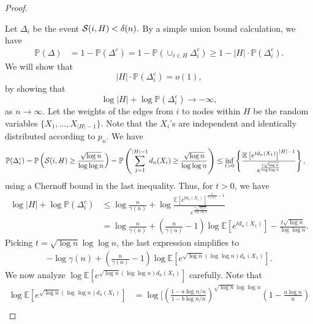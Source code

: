 \begin{proof}
\label{AppLemDelta}

Let $\Delta_i$ be the event  ${\cal S}(i , H) < \delta(n).$ By a simple union bound calculation, we have
\begin{align*}
\mathbb P(\Delta) &=1- \mathbb P(\Delta^c) = 1 - \mathbb P \left( \cup_{i \in H} \Delta_i^c \right) \ge 1 - |H| \cdot \mathbb P(\Delta_i^c).
\end{align*}
We will show that $$|H| \cdot \mathbb P(\Delta_i^c) = o(1),$$ by showing that
$$\log |H| + \log \mathbb P(\Delta_i^c) \to -\infty,$$ as $n \to \infty$. 
Let the weights of the edges from $i$ to nodes within $H$ be the random variables $\{X_1, \dots, X_{|H| - 1}\}$. Note that the $X_i$'s are independent and identically distributed according to $p_n$. We have
\begin{align*}
\mathbb P(\Delta_i^c) &= \mathbb P\left( {\cal S}(i, H) \geq \frac{\sqrt{\log n}}{\log \log n}\right) = \mathbb P\left( \sum_{j = 1}^ {|H|-1} d_n(X_i) \ge \frac{\sqrt{\log n}}{\log \log n}\right) \leq \inf_{t > 0} \left\{ \frac{\mathbb E\left[ e^{td_n(X_1)}\right]^{|H|-1}}{e^{\frac{t\sqrt{\log n}}{\log \log n}}}\right\},
\end{align*}
using a Chernoff bound in the last inequality. Thus, for $t > 0$, we have
\begin{align*}
\log |H| + \log \mathbb P(\Delta_i^c) &\leq \log \frac{n}{\gamma(n)} + \log \frac{\mathbb E\left[ e^{td_n(X_1)}\right]^{ \frac{n}{\gamma(n)}-1}}{e^{\frac{t\sqrt{\log n}}{\log \log n}}}\\
%
&= \log \frac{n}{\gamma(n)} + \left(\frac{n}{\gamma(n)}-1\right)\log \mathbb E\left[e^{td_n(X_1)} \right] - \frac{t\sqrt{\log n}}{\log \log n}.
\end{align*}
Picking $t = \sqrt{\log n}\log\log n$, the last expression simplifies to
\begin{align}\label{eq: master}
-\log \gamma(n) +  \left(\frac{n}{\gamma(n)}-1\right)\log \mathbb E\left[e^{\sqrt{\log n}(\log\log n) d_n(X_1)} \right].
\end{align}
We now analyze $\log \mathbb E\left[e^{\sqrt{\log n}(\log\log n) d_n(X_1)} \right]$ carefully. Note that
\begin{align*}
\log \mathbb E\left[e^{\sqrt{\log n}(\log\log n) d_n(X_1)} \right] &= \log \Bigg[\left( \frac{1-a\log n/n}{1 - b\log n/n}\right)^{\sqrt{\log n}\log \log n} \left(1-\frac{a\log n}{n}\right)\\

\end{align*}
\end{proof}
